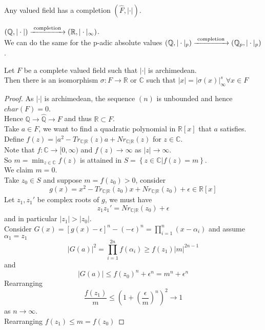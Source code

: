 \documentclass[../main.tex]{subfiles}
\begin{document}
Any valued field has a completion $( \hat{F},|\cdot|) $.
\begin{exemple}
	$ ( \mathbb{Q}, |\cdot|) \xrightarrow{ \text{ completion } } ( \mathbb{R},|\cdot|_{ \infty } ) $.\\
	We can do the same for the p-adic absolute values
	$( \mathbb{Q}, |\cdot|_p) \xrightarrow{ \text{ completion } } ( \mathbb{Q}_p, |\cdot|_p) $.
	
\end{exemple}
\begin{thm}[Ostrowski]
	Let $F$ be a complete valued field such that $|\cdot|$ is archimedean.\\
	Then there is an isomorphism $\sigma:F\to \mathbb{R}$ or $ \mathbb{C}$ such that $|x| = |\sigma( x) |_{ \infty }^{s}\forall x \in F$ 
\end{thm}
\begin{proof}
As $|\cdot|$ is archimedean, the sequence $( n) $ is unbounded and hence $char( F) = 0$.\\
Hence $ \mathbb{Q} \to \hat{ \mathbb{Q}} \to F$ and thus $ \mathbb{R}\subset F$.\\
Take $a\in F$, we want to find a quadratic polynomial in $ \mathbb{R}[x]$ that $a $ satisfies.
Define $f( z) = |a^{2}- Tr_{\mathbb{C}| \mathbb{R}} ( z) a + Nr_{\mathbb{C}|\mathbb{R}} ( z) $ for $ z \in \mathbb{C}$.\\
Note that $f: \mathbb{C}\to [ 0, \infty ) $ and $f( z) \to \infty $ as $|z| \to \infty $.\\
So $m = \min_{z\in \mathbb{C}} f(z) $ is attained in $S= \left\{ z\in \mathbb{C}| f( z) =m \right\} $.\\
We claim $m=0$.\\
Take $z_0 \in S$ and suppose $m = f( z_0) >0$, consider
\[ 
	g( x) = x^{2} - Tr_{ \mathbb{C}|\mathbb{R}} ( z_0) x + Nr_{ \mathbb{C}| \mathbb{R}} ( z_0) + \epsilon \in \mathbb{R}[x]
\]
Let $z_1,z_1'$ be complex roots of $g$, we must have 
\[ 
z_1z_1' = Nr_{\mathbb{C}|\mathbb{R}}( z_0) + \epsilon
\]
and in particular $ |z_1| > |z_0|$.\\
Consider $G( x) = [ g( x) - \epsilon]^{n}- ( -\epsilon)^{n}= \prod_{i=1}^{n}( x-\alpha_i) $ and assume $\alpha_1 = z_1$ 
\[ 
|G( a) |^{2}= \prod_{i=1} ^{2n} f( \alpha_i)  \geq  f( z_1 ) |m|^{2n-1}
\]
and 
\[ 
|G( a) | \leq  f( z_0) ^{n}+ \epsilon^{n}= m^{n}+ \epsilon^{n}
\]
Rearranging 
\[ 
\frac{f( z_1) }{m} \leq  ( 1+ ( \frac{\epsilon}{m})^{n}) ^{2} \to 1 
\]
as $n \to \infty $.\\
Rearranging $f( z_1) \leq m = f( z_0)  $ 
\end{proof}
\end{document}
